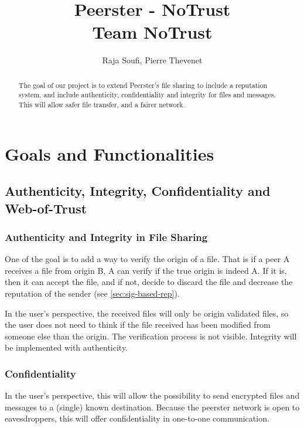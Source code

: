 \documentclass[]{article}
\title{Peerster - NoTrust\\
Team NoTrust}
\author{Raja Soufi, Pierre Thevenet}
\begin{document}
    
    \maketitle
    
    \begin{abstract}
        The goal of our project is to extend Peerster's file sharing to include a reputation system, and include authenticity, confidentiality and integrity for files and messages. This will allow safer file transfer, and a fairer network.
    \end{abstract}
    
    \section{Goals and Functionalities}
        
        \subsection{Authenticity, Integrity, Confidentiality and Web-of-Trust}
        
            \subsubsection{Authenticity and Integrity in File Sharing}
            \label{sec:goals-funcs-auth-integrity}
            One of the goal is to add a way to verify the origin of a file. That is if a peer A receives a file from origin B, A can verify if the true origin is indeed A. If it is, then it can accept the file, and if not, decide to discard the file and decrease the reputation of the sender (see \ref{sec:sig-based-rep}). \newline
            
            In the user's perspective, the received files will only be origin validated files, so the user does not need to think if the file received has been modified from someone else than the origin. The verification process is not visible.
            Integrity will be implemented with authenticity.
            
            \subsubsection{Confidentiality}
            In the user's perspective, this will allow the possibility to send encrypted files and messages to a (single) known destination. Because the peerster network is open to eavesdroppers, this will offer confidentiality in one-to-one communication.
            
\end{document}
